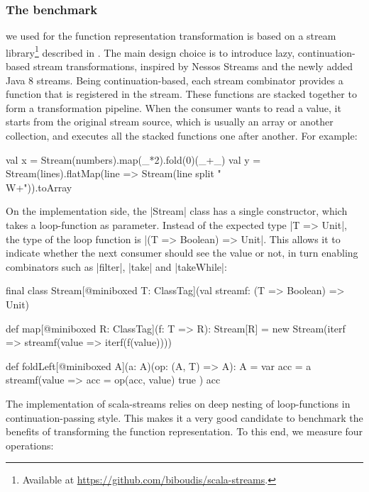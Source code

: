 \subsubsection{The benchmark} we used for the function representation transformation is based on a stream library\footnote{Available at \url{https://github.com/biboudis/scala-streams}.} described in \cite{biboudis_clash_2014}. The main design choice is to introduce lazy, continuation-based stream transformations, inspired by Nessos Streams \cite{nessos_streams} and the newly added Java 8 streams. Being continuation-based, each stream combinator provides a function that is registered in the stream. These functions are stacked together to form a transformation pipeline. When the consumer wants to read a value, it starts from the original stream source, which is usually an array or another collection, and executes all the stacked functions one after another. For example:

\begin{lstlisting-nobreak}
val x = Stream(numbers).map(_*2).fold(0)(_+_)
val y = Stream(lines).flatMap(line => Stream(line split "\\W+")).toArray
\end{lstlisting-nobreak}

On the implementation side, the |Stream| class has a single constructor, which takes a loop-function as parameter. Instead of the expected type |T => Unit|, the type of the loop function is |(T => Boolean) => Unit|. This allows it to indicate whether the next consumer should see the value or not, in turn enabling combinators such as |filter|, |take| and |takeWhile|:

\begin{lstlisting-nobreak}
final class Stream[@miniboxed T: ClassTag](val streamf: (T => Boolean) => Unit) {
  def map[@miniboxed R: ClassTag](f: T => R): Stream[R] =
    new Stream(iterf => streamf(value => iterf(f(value))))

  def foldLeft[@miniboxed A](a: A)(op: (A, T) => A): A = {
    var acc = a
    streamf(value => {
      acc = op(acc, value)
      true
    })
    acc
  }
}
\end{lstlisting-nobreak}

The implementation of scala-streams relies on deep nesting of loop-functions in continuation-passing style. This makes it a very good candidate to benchmark the benefits of transforming the function representation. To this end, we measure four operations:

